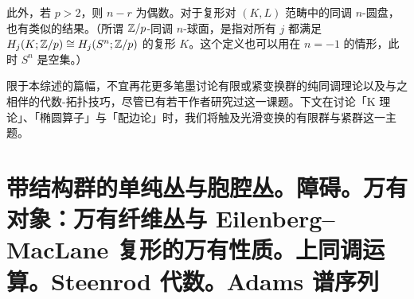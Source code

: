 此外，若 $p>2$，则 $n-r$ 为偶数。对于复形对 $(K,L)$ 范畴中的同调 $n$-圆盘，也有类似的结果。（所谓 $\mathbb{Z}/p$-同调 $n$-球面，是指对所有 $j$ 都满足 $H_j(K;\mathbb{Z}/p)\cong H_j(S^n;\mathbb{Z}/p)$ 的复形 $K$。这个定义也可以用在 $n=-1$ 的情形，此时 $S^n$ 是空集。）


限于本综述的篇幅，不宜再花更多笔墨讨论有限或紧变换群的纯同调理论以及与之相伴的代数-拓扑技巧，尽管已有若干作者研究过这一课题。下文在讨论「K 理论」、「椭圆算子」与「配边论」时，我们将触及光滑变换的有限群与紧群这一主题。

\section[带结构群的丛与障碍。 万有对象。 上同调运算。 Adams 谱序列]{带结构群的单纯丛与胞腔丛。障碍。万有对象：万有纤维丛与 Eilenberg--MacLane 复形的万有性质。上同调运算。Steenrod 代数。Adams 谱序列}


